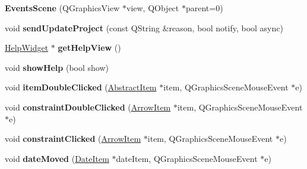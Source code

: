 \begin{DoxyCompactItemize}
\item 
\hypertarget{class_events_scene_a82a60297df9696a57466a46c8768eb67}{{\bfseries Events\-Scene} (Q\-Graphics\-View $\ast$view, Q\-Object $\ast$parent=0)}\label{class_events_scene_a82a60297df9696a57466a46c8768eb67}

\item 
\hypertarget{class_events_scene_a7b5ebbc162172ec0632067ef1d2b1506}{void {\bfseries send\-Update\-Project} (const Q\-String \&reason, bool notify, bool async)}\label{class_events_scene_a7b5ebbc162172ec0632067ef1d2b1506}

\item 
\hypertarget{class_events_scene_a3d177ee4f776951cc76ff3b58b2106dc}{\hyperlink{class_help_widget}{Help\-Widget} $\ast$ {\bfseries get\-Help\-View} ()}\label{class_events_scene_a3d177ee4f776951cc76ff3b58b2106dc}

\item 
\hypertarget{class_events_scene_a3c095b1af77713bef491469c0da44799}{void {\bfseries show\-Help} (bool show)}\label{class_events_scene_a3c095b1af77713bef491469c0da44799}

\item 
\hypertarget{class_events_scene_a6d245af3315fa9874210601b052807a5}{void {\bfseries item\-Double\-Clicked} (\hyperlink{class_abstract_item}{Abstract\-Item} $\ast$item, Q\-Graphics\-Scene\-Mouse\-Event $\ast$e)}\label{class_events_scene_a6d245af3315fa9874210601b052807a5}

\item 
\hypertarget{class_events_scene_a35658cb35c105c3bd58912e0228025fb}{void {\bfseries constraint\-Double\-Clicked} (\hyperlink{class_arrow_item}{Arrow\-Item} $\ast$item, Q\-Graphics\-Scene\-Mouse\-Event $\ast$e)}\label{class_events_scene_a35658cb35c105c3bd58912e0228025fb}

\item 
\hypertarget{class_events_scene_a43dabe0528018fac2dab661a345eb55a}{void {\bfseries constraint\-Clicked} (\hyperlink{class_arrow_item}{Arrow\-Item} $\ast$item, Q\-Graphics\-Scene\-Mouse\-Event $\ast$e)}\label{class_events_scene_a43dabe0528018fac2dab661a345eb55a}

\item 
\hypertarget{class_events_scene_ae8533a089e714107c47c64219a7f2267}{void {\bfseries date\-Moved} (\hyperlink{class_date_item}{Date\-Item} $\ast$date\-Item, Q\-Graphics\-Scene\-Mouse\-Event $\ast$e)}\label{class_events_scene_ae8533a089e714107c47c64219a7f2267}


\end{DoxyCompactItemize}
